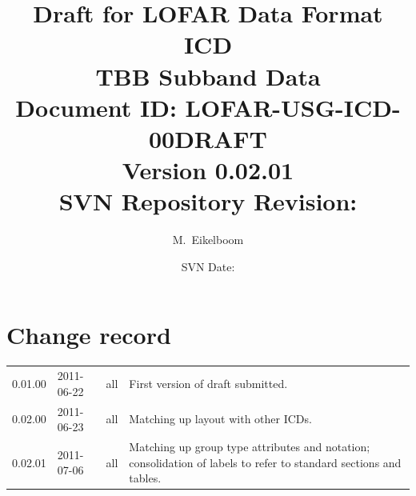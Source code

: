 \documentclass[a4paper,10pt,bibtotoc]{scrartcl}
\begin{document}
\title{Draft for LOFAR Data Format ICD \\ TBB Subband Data \\
  {\normalsize Document ID: LOFAR-USG-ICD-00DRAFT} \\ 
  {\normalsize Version 0.02.01} \\
  {\normalsize SVN Repository Revision: \svnInfoRevision}}
\author{M.~Eikelboom}
\date{\small{SVN Date: \svnInfoDate}}

\maketitle

\tableofcontents

\clearpage


\section*{Change record}

\begin{center}
  \tablelasttail{\hline}
  \begin{supertabular}{lllp{10cm}}
    0.01.00 & 2011-06-22 & all & First version of draft submitted. \\
    0.02.00 & 2011-06-23 & all & Matching up layout with other ICDs. \\
    0.02.01 & 2011-07-06 & all & Matching up group type attributes and
    notation; consolidation of labels to refer to standard sections
    and tables. \\
 \end{supertabular}
\end{center}


\end{document}
